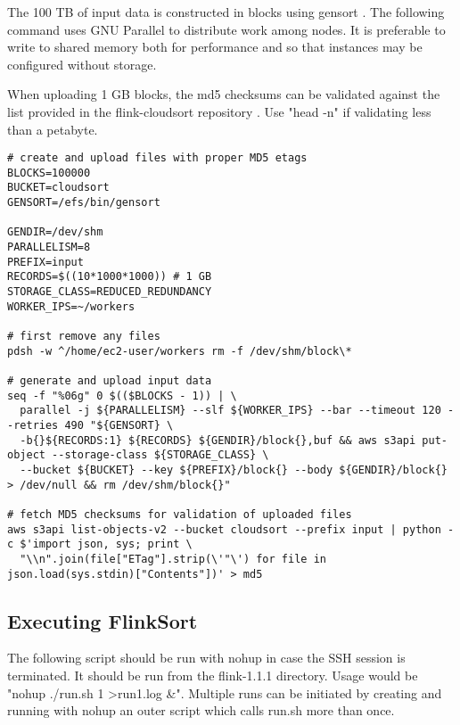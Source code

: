 \documentclass{article}
\begin{document}
The 100 TB of input data is constructed in blocks using gensort \cite{gensort}. The following command uses GNU Parallel \cite{gnuparallel} to distribute work among nodes. It is preferable to write to shared memory both for performance and so that instances may be configured without storage.

When uploading 1 GB blocks, the md5 checksums can be validated against the list provided in the flink-cloudsort repository \cite{flink-cloudsort}. Use "head -n" if validating less than a petabyte.

\begin{adjustwidth}{-1.5in}{-1.5in}
\begin{verbatim}
# create and upload files with proper MD5 etags
BLOCKS=100000
BUCKET=cloudsort
GENSORT=/efs/bin/gensort

GENDIR=/dev/shm
PARALLELISM=8
PREFIX=input
RECORDS=$((10*1000*1000)) # 1 GB
STORAGE_CLASS=REDUCED_REDUNDANCY
WORKER_IPS=~/workers

# first remove any files 
pdsh -w ^/home/ec2-user/workers rm -f /dev/shm/block\*

# generate and upload input data
seq -f "%06g" 0 $(($BLOCKS - 1)) | \
  parallel -j ${PARALLELISM} --slf ${WORKER_IPS} --bar --timeout 120 --retries 490 "${GENSORT} \
  -b{}${RECORDS:1} ${RECORDS} ${GENDIR}/block{},buf && aws s3api put-object --storage-class ${STORAGE_CLASS} \
  --bucket ${BUCKET} --key ${PREFIX}/block{} --body ${GENDIR}/block{} > /dev/null && rm /dev/shm/block{}"

# fetch MD5 checksums for validation of uploaded files
aws s3api list-objects-v2 --bucket cloudsort --prefix input | python -c $'import json, sys; print \
  "\\n".join(file["ETag"].strip(\'"\') for file in json.load(sys.stdin)["Contents"])' > md5
\end{verbatim}
\end{adjustwidth}

\subsection{Executing FlinkSort}

The following script should be run with nohup in case the SSH session is terminated. It should be run from the flink-1.1.1 directory. Usage would be "nohup ./run.sh 1 \textgreater run1.log \&". Multiple runs can be initiated by creating and running with nohup an outer script which calls run.sh more than once.
\end{document}
